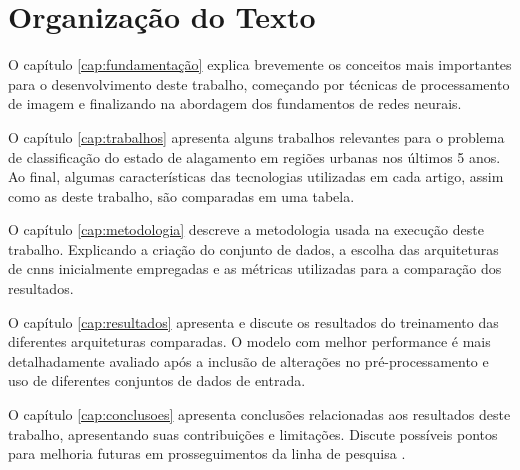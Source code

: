 \section{Organização do Texto}\label{Organização do texto}

O capítulo \ref{cap:fundamentação} explica brevemente os conceitos mais importantes para o desenvolvimento deste trabalho, começando por técnicas de processamento de imagem e finalizando na abordagem dos fundamentos de redes neurais.

O capítulo \ref{cap:trabalhos} apresenta alguns trabalhos relevantes para o problema de classificação do estado de alagamento em regiões urbanas nos últimos 5 anos. Ao final, algumas características das tecnologias utilizadas em cada artigo, assim como as deste trabalho, são comparadas em uma tabela.

O capítulo \ref{cap:metodologia} descreve a metodologia usada na execução deste trabalho. Explicando a criação do conjunto de dados, a escolha das arquiteturas de \acrshort{cnn}s inicialmente empregadas e as métricas utilizadas para a comparação dos resultados.

O capítulo \ref{cap:resultados} apresenta e discute os resultados do treinamento das diferentes arquiteturas comparadas. O modelo com melhor performance é mais detalhadamente avaliado após a inclusão de alterações no pré-processamento e uso de diferentes conjuntos de dados de entrada.

O capítulo \ref{cap:conclusoes} apresenta conclusões relacionadas aos resultados deste trabalho, apresentando suas contribuições e limitações. Discute possíveis pontos para melhoria futuras em prosseguimentos da linha de pesquisa .